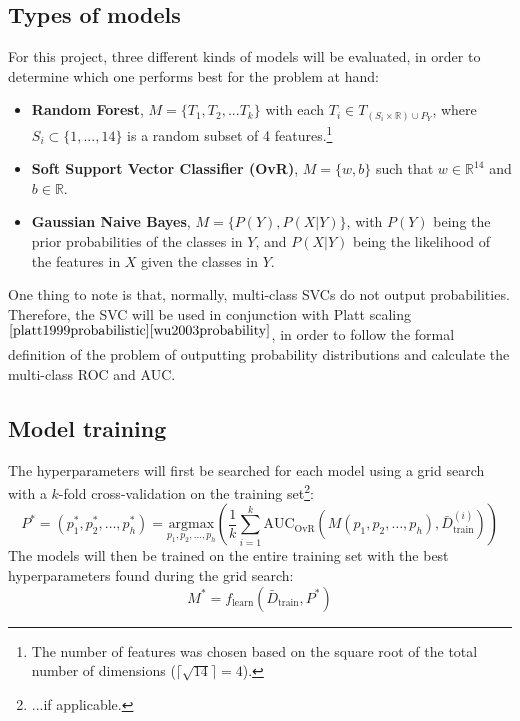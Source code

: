 \documentclass{article}
\begin{document}
\subsection{Types of models}
For this project, three different kinds of models will be evaluated, in order to determine which one performs best for the problem at hand:
\begin{itemize}
    \item \textbf{Random Forest}, $M = \{T_1, T_2,... T_k\}$ with each $T_i \in T_{(S_i \times \mathbb{R}) \cup P_{Y}}$, where $S_i \subset \{1,...,14\}$ is a random subset of 4 features.\footnote{The number of features was chosen based on the square root of the total number of dimensions ($\lceil\sqrt{14}\rceil = 4$).}
    \item \textbf{Soft Support Vector Classifier (OvR)}, $M = \{w, b\}$ such that $w \in \mathbb{R}^{14}$ and $b \in \mathbb{R}$.
    \item \textbf{Gaussian Naive Bayes}, $M = \{P(Y), P(X|Y)\}$, with $P(Y)$ being the prior probabilities of the classes in $Y$, and $P(X|Y)$ being the likelihood of the features in $X$ given the classes in $Y$.
\end{itemize}
One thing to note is that, normally, multi-class SVCs do not output probabilities.
Therefore, the SVC will be used in conjunction with Platt scaling$^{\cite{platt1999probabilistic}\cite{wu2003probability}}$, in order to follow the formal definition of the problem of outputting probability distributions and calculate the multi-class ROC and AUC.


\subsection{Model training}
The hyperparameters will first be searched for each model using a grid search with a $k$-fold cross-validation on the training set\footnote{...if applicable.}:
\begin{equation*}
    P^{*} = 
    (p_{1}^{*}, p_{2}^{*}, \dots, p_{h}^{*}) = 
    \underset{p_{1}, p_{2}, \dots, p_{h}}{\text{argmax}}
        \left(\frac{1}{k}\sum_{i=1}^{k}\text{AUC}_{\text{OvR}}
            (M(p_{1}, p_{2}, \dots, p_{h}), 
            \bar{D}_{\text{train}}^{(i)})
        \right)
\end{equation*}
The models will then be trained on the entire training set with the best hyperparameters found during the grid search:
\begin{equation*}
    M^{*} = f_{\text{learn}}{(\bar{D}_{\text{train}}, P^{*})}
\end{equation*}
\end{document}
